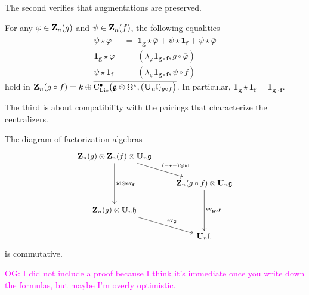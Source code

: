 \documentclass[11pt]{amsart}
\numberwithin{equation}{section}
\def\owen{\textcolor{magenta}{OG: }\textcolor{magenta}}
\begin{document}
The second verifies that augmentations are preserved.

\begin{lmm}
\label{L:compisaugmented} 
For any $\varphi \in \mathbf Z_n(g)$ and
$\psi \in \mathbf Z_n(f)$,
the following equalities 
\begin{align}
\overline{\psi\star \varphi} &\;= \;\mathbf{1_g}\star \overline{\varphi} +\overline{\psi}\star \mathbf{1_f} +\overline{\psi}\star \overline{\varphi} \\
\mathbf{1_g}\star \varphi &\;=\;  (\lambda_\varphi \mathbf{1_{g \circ f}}, g\circ \overline{\varphi})\\
\psi \star \mathbf{1_f} &\;=\; (\lambda_\psi \mathbf{1_{g \circ f}}, \overline{\psi} \circ f) 
\end{align}
hold in $\mathbf Z_n(g \circ f) = k  \oplus \overline{{\rm C}_{\rm Lie}^\bullet\big(\mathfrak g \otimes \Omega^*, (\mathbf U_n \mathfrak l)_{g \circ f}  \big)}$.
In particular, $\mathbf{1_g} \star \mathbf{1_f} =\mathbf{1_{g \circ f}}$.
\end{lmm}

The third is about compatibility with the pairings that characterize the centralizers.
 
\begin{lmm}
\label{L:NatPptyofComp}
 The diagram of factorization algebras 
 \[
 \small
 \begin{tikzcd}
 \bZ_n(g)
 \otimes  \bZ_n(f) \otimes \bU_n \fg \arrow[rd, "(-\star-)\otimes \id"]
 \arrow[dd, "\id\otimes \ev_ {\mathbf{f}}"]& \\ 
 & \bZ_n(g \circ f)
 \otimes \bU_n \fg
 \arrow[dd, "\ev_{\mathbf{g}\circ \mathbf{f}}"]\\
\bZ_n(g) \otimes \bU_n \fh  \arrow[rd, "\ev_{\mathbf{g}}"] & \\  
 & \bU_n \fl. 
\end{tikzcd}
\]
 is commutative.
\end{lmm}

\owen{I did not include a proof because I think it's immediate once you write down the formulas,
but maybe I'm overly optimistic.}
\end{document}
